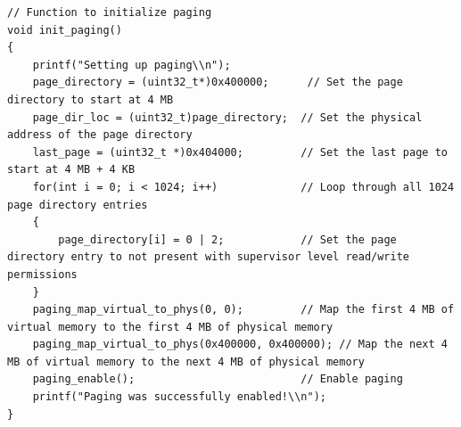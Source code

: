 \documentclass[../main.tex]{subfiles}
\begin{document}
\begin{verbatim}
// Function to initialize paging
void init_paging()
{
    printf("Setting up paging\\n");
    page_directory = (uint32_t*)0x400000;      // Set the page directory to start at 4 MB
    page_dir_loc = (uint32_t)page_directory;  // Set the physical address of the page directory
    last_page = (uint32_t *)0x404000;         // Set the last page to start at 4 MB + 4 KB
    for(int i = 0; i < 1024; i++)             // Loop through all 1024 page directory entries
    {
        page_directory[i] = 0 | 2;            // Set the page directory entry to not present with supervisor level read/write permissions
    }
    paging_map_virtual_to_phys(0, 0);         // Map the first 4 MB of virtual memory to the first 4 MB of physical memory
    paging_map_virtual_to_phys(0x400000, 0x400000); // Map the next 4 MB of virtual memory to the next 4 MB of physical memory
    paging_enable();                          // Enable paging
    printf("Paging was successfully enabled!\\n");
}

\end{verbatim}
\end{document}
